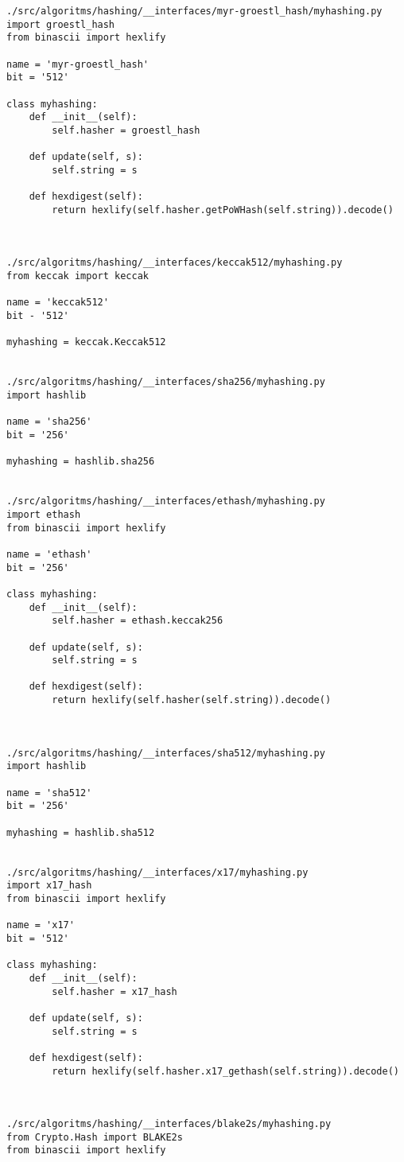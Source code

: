 \begin{lstlisting}
./src/algoritms/hashing/__interfaces/myr-groestl_hash/myhashing.py
import groestl_hash
from binascii import hexlify

name = 'myr-groestl_hash'
bit = '512'

class myhashing:
    def __init__(self):
        self.hasher = groestl_hash

    def update(self, s):
        self.string = s

    def hexdigest(self):
        return hexlify(self.hasher.getPoWHash(self.string)).decode()



./src/algoritms/hashing/__interfaces/keccak512/myhashing.py
from keccak import keccak

name = 'keccak512'
bit - '512'

myhashing = keccak.Keccak512


./src/algoritms/hashing/__interfaces/sha256/myhashing.py
import hashlib

name = 'sha256'
bit = '256'

myhashing = hashlib.sha256


./src/algoritms/hashing/__interfaces/ethash/myhashing.py
import ethash
from binascii import hexlify

name = 'ethash'
bit = '256'

class myhashing:
    def __init__(self):
        self.hasher = ethash.keccak256

    def update(self, s):
        self.string = s

    def hexdigest(self):
        return hexlify(self.hasher(self.string)).decode()



./src/algoritms/hashing/__interfaces/sha512/myhashing.py
import hashlib

name = 'sha512'
bit = '256'

myhashing = hashlib.sha512


./src/algoritms/hashing/__interfaces/x17/myhashing.py
import x17_hash
from binascii import hexlify

name = 'x17'
bit = '512'

class myhashing:
    def __init__(self):
        self.hasher = x17_hash

    def update(self, s):
        self.string = s

    def hexdigest(self):
        return hexlify(self.hasher.x17_gethash(self.string)).decode()



./src/algoritms/hashing/__interfaces/blake2s/myhashing.py
from Crypto.Hash import BLAKE2s
from binascii import hexlify


\end{lstlisting}
